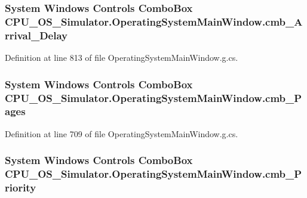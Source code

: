 \subsubsection[{cmb\+\_\+\+Arrival\+\_\+\+Delay}]{\setlength{\rightskip}{0pt plus 5cm}System Windows Controls Combo\+Box C\+P\+U\+\_\+\+O\+S\+\_\+\+Simulator.\+Operating\+System\+Main\+Window.\+cmb\+\_\+\+Arrival\+\_\+\+Delay\hspace{0.3cm}{\ttfamily [package]}}\label{class_c_p_u___o_s___simulator_1_1_operating_system_main_window_ad4e310b5bbd70de23e9132fb57229c96}


Definition at line 813 of file Operating\+System\+Main\+Window.\+g.\+cs.

\hypertarget{class_c_p_u___o_s___simulator_1_1_operating_system_main_window_ab8bcdf83f7bfdecbdd3f8ba71cc92a5e}{}
\subsubsection[{cmb\+\_\+\+Pages}]{\setlength{\rightskip}{0pt plus 5cm}System Windows Controls Combo\+Box C\+P\+U\+\_\+\+O\+S\+\_\+\+Simulator.\+Operating\+System\+Main\+Window.\+cmb\+\_\+\+Pages\hspace{0.3cm}{\ttfamily [package]}}\label{class_c_p_u___o_s___simulator_1_1_operating_system_main_window_ab8bcdf83f7bfdecbdd3f8ba71cc92a5e}


Definition at line 709 of file Operating\+System\+Main\+Window.\+g.\+cs.

\hypertarget{class_c_p_u___o_s___simulator_1_1_operating_system_main_window_a52618598a5f66eb457af669a7ca849d9}{}
\subsubsection[{cmb\+\_\+\+Priority}]{\setlength{\rightskip}{0pt plus 5cm}System Windows Controls Combo\+Box C\+P\+U\+\_\+\+O\+S\+\_\+\+Simulator.\+Operating\+System\+Main\+Window.\+cmb\+\_\+\+Priority\hspace{0.3cm}{\ttfamily [package]}}\label{class_c_p_u___o_s___simulator_1_1_operating_system_main_window_a52618598a5f66eb457af669a7ca849d9}


